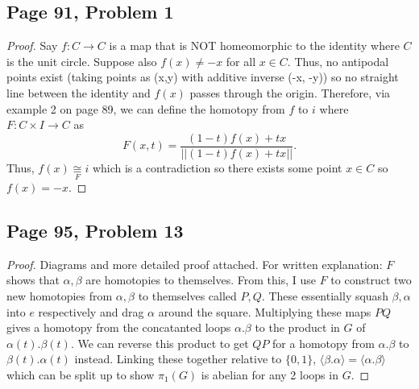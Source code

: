 \subsection*{Page 91, Problem 1}
\vspace{15pt}
\begin{proof}
    \vspace{-10pt}
    Say $f\colon C \to C$ is a map that is NOT homeomorphic to the identity where $C$ is the unit circle. Suppose also $f(x) \neq -x$ for all $x \in C$. Thus, no antipodal points exist (taking points as (x,y) with additive inverse (-x, -y)) so no straight line between the identity and $f(x)$ passes through the origin. Therefore, via example 2 on page 89, we can define the homotopy from $f$ to $i$ where $F\colon C\times I \to C$ as $$F(x,t) = \frac{(1-t)f(x)+tx}{||(1-t)f(x)+tx||}.$$ Thus, $f(x) \underset{F}{\cong} i$ which is a contradiction so there exists some point $x \in C$ so $f(x) = -x.$
\end{proof}

\subsection*{Page 95, Problem 13}
\vspace{15pt}
\begin{proof}
    \vspace{-10pt}
    Diagrams and more detailed proof attached. For written explanation: $F$ shows that $\alpha, \beta$ are homotopies to themselves. From this, I use $F$ to construct two new homotopies from $\alpha, \beta$ to themselves called $P, Q$. These essentially squash $\beta, \alpha$ into $e$ respectively and drag $\alpha$ around the square. Multiplying these maps $PQ$ gives a homotopy from the concatanted loops $\alpha.\beta$ to the product in $G$ of $\alpha(t).\beta(t)$. We can reverse this product to get $QP$ for a homotopy from $\alpha.\beta$ to $\beta(t).\alpha(t)$ instead. Linking these together relative to $\{0,1\}$, $\langle \beta.\alpha \rangle = \langle \alpha.\beta \rangle$ which can be split up to show $\pi_1(G)$ is abelian for any 2 loops in $G$.
\end{proof}
